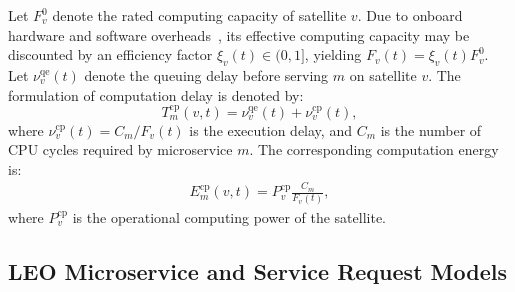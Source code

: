 \documentclass[10pt, conference, letterpaper]{IEEEtran}
\begin{document}
Let $F^0_v$ denote the rated computing capacity of satellite $v$. Due to onboard hardware and software overheads~\cite{joint_orbit_comp_comm4data_Download}, its effective computing capacity may be discounted by an efficiency factor $\xi_v(t)\in(0,1]$, yielding $F_v(t) = \xi_v(t)F^0_v$.
Let $\nu^{\text{qe}}_v(t)$ denote the queuing delay before serving $m$ on satellite $v$. The formulation of computation delay is denoted by:
\begin{equation}
T_m^{\text{cp}}(v,t) = \nu^{\text{qe}}_v(t) + \nu^{\text{cp}}_v(t),
\label{eq:compute_delay_elara}
\end{equation}
where $\nu^{\text{cp}}_v(t) = C_m / {F_v(t)}$ is the execution delay, and $C_m$ is the number of CPU cycles required by microservice $m$.
The corresponding computation energy is:
\begin{align}
E_m^{\text{cp}}(v,t) = P_v^{\text{cp}} \frac{C_m}{F_v(t)},
\label{eq:compute_energy_elara}
\end{align}
where $P_v^{\text{cp}}$ is the operational computing power of the satellite.



\subsection{LEO Microservice and Service Request Models}
\label{subsec:microservice_request_elara}
\end{document}
